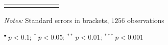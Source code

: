 \documentclass[a4paper,12pt]{article}
\begin{document}
{\begin{threeparttable}
\begin{small}
\begin{tabular}{lcrcrcr}
\hline
\vspace{-0.2cm}
\end{tabular} 
\end{small}
 \begin{tablenotes}
  \begin{footnotesize}
    \item \textit{Notes:} Standard errors in brackets, \hspace{0.05cm}$1256$ observations
        \begin{adjustwidth}{1cm}{} 
    \item \hspace{0.45cm}$^{\bullet}~p<0.1$; $^{*}~p<0.05$; $^{**}~p<0.01$; $^{***}~p<0.001$
     \end{adjustwidth}
\singlespacing
  \end{footnotesize}
\end{tablenotes}
  \end{threeparttable} 
\par}
\linespread{1}

\pagebreak
\end{document}
